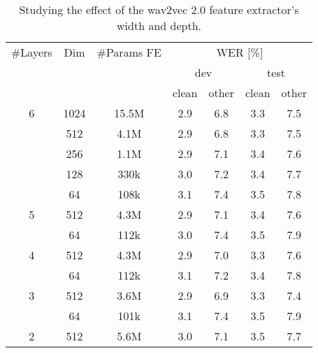
\begin{table}[htbp]

\centering
\caption{Studying the effect of the wav2vec 2.0 feature extractor's width and depth.}
\label{table:features_w2v_size}
\begin{tabular}{|c|c|c|c|c|c|c|}
\hline
\#Layers &      Dim & \#Params FE & \multicolumn{4}{c|}{{WER [\%]}} \\\cline{4-7}
         &          &             &      \multicolumn{2}{c|}{{dev}} & \multicolumn{2}{c|}{{test}} \\\cline{4-7}
         &          &             &                         {clean} & other &                     {clean} & other \\\hline\hline
       6 &     1024 &       15.5M &                             2.9 &   6.8 &                         3.3 &   7.5 \\\cline{2-7}
         &      512 &        4.1M &                             2.9 &   6.8 &                         3.3 &   7.5 \\\cline{2-7}
         &      256 &        1.1M &                             2.9 &   7.1 &                         3.4 &   7.6 \\\cline{2-7}
         &      128 &        330k &                             3.0 &   7.2 &                         3.4 &   7.7 \\\cline{2-7}
         &       64 &        108k &                             3.1 &   7.4 &                         3.5 &   7.8 \\\hline
       5 &      512 &        4.3M &                             2.9 &   7.1 &                         3.4 &   7.6 \\\cline{2-7}
         &       64 &        112k &                             3.0 &   7.4 &                         3.5 &   7.9 \\\hline
       4 &      512 &        4.3M &                             2.9 &   7.0 &                         3.3 &   7.6 \\\cline{2-7}
         &       64 &        112k &                             3.1 &   7.2 &                         3.4 &   7.8 \\\hline
       3 &      512 &        3.6M &                             2.9 &   6.9 &                         3.3 &   7.4 \\\cline{2-7}
         &       64 &        101k &                             3.1 &   7.4 &                         3.5 &   7.9 \\\hline
       2 &      512 &        5.6M &                             3.0 &   7.1 &                         3.5 &   7.7 \\\cline{2-7}

\end{tabular}
\end{table}
